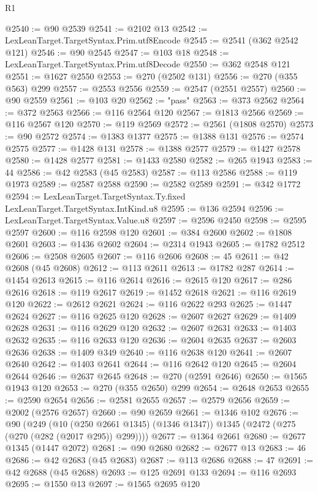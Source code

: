 \begin{lexlean}{R1}
\begin{coremodule}
@2540 := @90 @2539
@2541 := @2102 @13
@2542 := LexLeanTarget.TargetSyntax.Prim.utf8Encode
@2545 := @2541 (@362 @2542 @121)
@2546 := @90 @2545
@2547 := @103 @18
@2548 := LexLeanTarget.TargetSyntax.Prim.utf8Decode
@2550 := @362 @2548 @121
@2551 := @1627 @2550
@2553 := @270 (@2502 @131)
@2556 := @270 (@355 @563) @299
@2557 := @2553 @2556
@2559 := @2547 (@2551 @2557)
@2560 := @90 @2559
@2561 := @103 @20
@2562 := "pass"
@2563 := @373 @2562
@2564 := @372 @2563
@2566 := @116 @2564 @120
@2567 := @1813 @2566
@2569 := @116 @2567 @120
@2570 := @119 @2569
@2572 := @2561 (@1808 @2570)
@2573 := @90 @2572
@2574 := @1383 @1377
@2575 := @1388 @131
@2576 := @2574 @2575
@2577 := @1428 @131
@2578 := @1388 @2577
@2579 := @1427 @2578
@2580 := @1428 @2577
@2581 := @1433 @2580
@2582 := @265 @1943
@2583 := 44
@2586 := @42 @2583 (@45 @2583)
@2587 := @113 @2586
@2588 := @119 @1973
@2589 := @2587 @2588
@2590 := @2582 @2589
@2591 := @342 @1772
@2594 := LexLeanTarget.TargetSyntax.Ty.fixed LexLeanTarget.TargetSyntax.IntKind.u8
@2595 := @136 @2594
@2596 := LexLeanTarget.TargetSyntax.Value.u8
@2597 := @2596 @2450
@2598 := @2595 @2597
@2600 := @116 @2598 @120
@2601 := @384 @2600
@2602 := @1808 @2601
@2603 := @1436 @2602
@2604 := @2314 @1943
@2605 := @1782 @2512
@2606 := @2508 @2605
@2607 := @116 @2606
@2608 := 45
@2611 := @42 @2608 (@45 @2608)
@2612 := @113 @2611
@2613 := @1782 @287
@2614 := @1454 @2613
@2615 := @116 @2614
@2616 := @2615 @120
@2617 := @286 @2616
@2618 := @119 @2617
@2619 := @1452 @2618
@2621 := @116 @2619 @120
@2622 := @2612 @2621
@2624 := @116 @2622 @293
@2625 := @1447 @2624
@2627 := @116 @2625 @120
@2628 := @2607 @2627
@2629 := @1409 @2628
@2631 := @116 @2629 @120
@2632 := @2607 @2631
@2633 := @1403 @2632
@2635 := @116 @2633 @120
@2636 := @2604 @2635
@2637 := @2603 @2636
@2638 := @1409 @349
@2640 := @116 @2638 @120
@2641 := @2607 @2640
@2642 := @1403 @2641
@2644 := @116 @2642 @120
@2645 := @2604 @2644
@2646 := @2637 @2645
@2648 := @270 (@2591 @2646)
@2650 := @1565 @1943 @120
@2653 := @270 (@355 @2650) @299
@2654 := @2648 @2653
@2655 := @2590 @2654
@2656 := @2581 @2655
@2657 := @2579 @2656
@2659 := @2002 (@2576 @2657)
@2660 := @90 @2659
@2661 := @1346 @102
@2676 := @90
    (@249
      (@10 (@250 @2661 @1345) (@1346 @1347))
      @1345
      (@2472 (@275 (@270 (@282 (@2017 @295)) @299))))
@2677 := @1364 @2661
@2680 := @2677 @1345 (@1447 @2072)
@2681 := @90 @2680
@2682 := @2677 @13
@2683 := 46
@2686 := @42 @2683 (@45 @2683)
@2687 := @113 @2686
@2688 := 47
@2691 := @42 @2688 (@45 @2688)
@2693 := @125 @2691 @133
@2694 := @116 @2693
@2695 := @1550 @13
@2697 := @1565 @2695 @120

\end{coremodule}
\end{lexlean}
